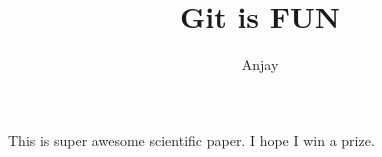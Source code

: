 \documentclass[10pt]{article}
\author{Anjay}
\title{Git is FUN}
\begin{document}
      \maketile

      This is super awesome scientific paper.
      I hope I win a prize.
\end{document}
